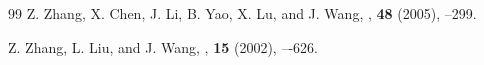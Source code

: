 \documentclass[12pt,reqno,a4paper]{amsart}
\theoremstyle{definition}
\theoremstyle{plain}
\begin{document}
\begin{thebibliography}{99}
Z. Zhang, X. Chen, J. Li, B. Yao, X. Lu, and J. Wang,
,
\newblock \textbf{48}
\newblock (2005),
--299.

Z. Zhang, L. Liu, and J. Wang, 
,
\newblock \textbf{15}
\newblock (2002),
–-626.

\end{thebibliography}
\end{document}
